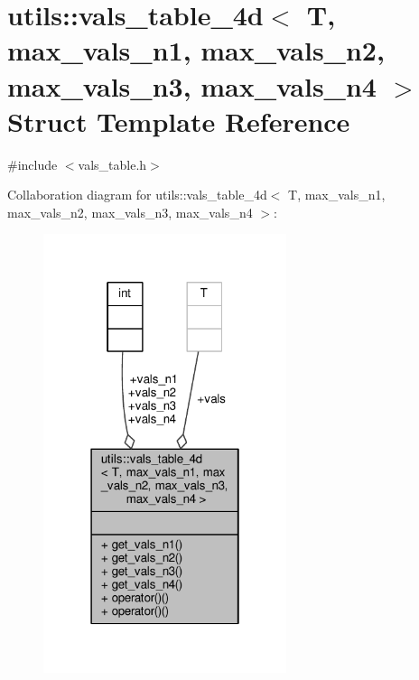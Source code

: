\hypertarget{structutils_1_1vals__table__4d}{\section{utils\-:\-:vals\-\_\-table\-\_\-4d$<$ T, max\-\_\-vals\-\_\-n1, max\-\_\-vals\-\_\-n2, max\-\_\-vals\-\_\-n3, max\-\_\-vals\-\_\-n4 $>$ Struct Template Reference}
\label{structutils_1_1vals__table__4d}
}


{\ttfamily \#include $<$vals\-\_\-table.\-h$>$}



Collaboration diagram for utils\-:\-:vals\-\_\-table\-\_\-4d$<$ T, max\-\_\-vals\-\_\-n1, max\-\_\-vals\-\_\-n2, max\-\_\-vals\-\_\-n3, max\-\_\-vals\-\_\-n4 $>$\-:\nopagebreak
\begin{figure}[H]
\begin{center}
\leavevmode
\includegraphics[width=202pt]{structutils_1_1vals__table__4d__coll__graph}
\end{center}
\end{figure}
